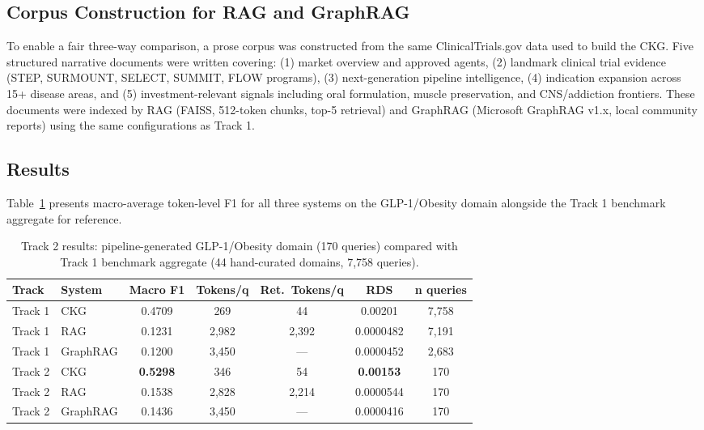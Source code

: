 \subsection{Corpus Construction for RAG and GraphRAG}

To enable a fair three-way comparison, a prose corpus was constructed
from the same ClinicalTrials.gov data used to build the CKG. Five
structured narrative documents were written covering: (1) market overview
and approved agents, (2) landmark clinical trial evidence (STEP,
SURMOUNT, SELECT, SUMMIT, FLOW programs), (3) next-generation pipeline
intelligence, (4) indication expansion across 15+ disease areas, and
(5) investment-relevant signals including oral formulation, muscle
preservation, and CNS/addiction frontiers. These documents were indexed
by RAG (FAISS, 512-token chunks, top-5 retrieval) and GraphRAG (Microsoft
GraphRAG v1.x, local community reports) using the same configurations
as Track 1.

\subsection{Results}

Table~\ref{tab:track2-results} presents macro-average token-level F1
for all three systems on the GLP-1/Obesity domain alongside the
Track 1 benchmark aggregate for reference.

\begin{table}[htbp]
\centering
\caption{Track 2 results: pipeline-generated GLP-1/Obesity domain (170 queries)
compared with Track 1 benchmark aggregate (44 hand-curated domains, 7,758 queries).}
\label{tab:track2-results}
\begin{tabular}{llccccc}
\toprule
\textbf{Track} & \textbf{System} & \textbf{Macro F1} & \textbf{Tokens/q} &
  \textbf{Ret.\ Tokens/q} & \textbf{RDS} & \textbf{n queries} \\
\midrule
Track 1 & CKG      & 0.4709 & 269  & 44   & 0.00201 & 7,758 \\
Track 1 & RAG      & 0.1231 & 2,982 & 2,392 & 0.0000482 & 7,191 \\
Track 1 & GraphRAG & 0.1200 & 3,450 & ---  & 0.0000452 & 2,683 \\
\midrule
Track 2 & CKG      & \textbf{0.5298} & 346  & 54   & \textbf{0.00153} & 170 \\
Track 2 & RAG      & 0.1538 & 2,828 & 2,214 & 0.0000544 & 170 \\
Track 2 & GraphRAG & 0.1436 & 3,450 & ---  & 0.0000416 & 170 \\
\bottomrule
\end{tabular}
\end{table}

